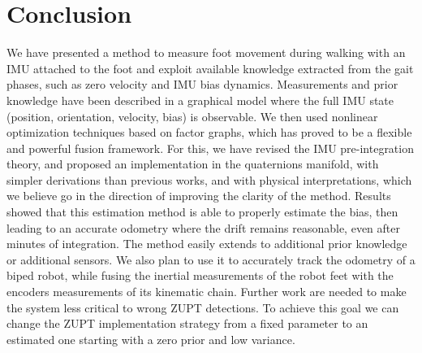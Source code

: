 
\section{Conclusion}

We have presented a method to measure foot movement during walking with an IMU attached to the foot and exploit available knowledge extracted from the gait phases, such as zero velocity and IMU bias dynamics. 
Measurements and prior knowledge have been described in a graphical model where the full IMU state (position, orientation, velocity, bias) is observable. 
We then used nonlinear optimization techniques based on factor graphs, which has proved to be a flexible and powerful fusion framework. For this, we have revised the IMU pre-integration theory, and proposed an implementation in the quaternions manifold, with simpler derivations than previous works, and with physical interpretations, which we believe go in the direction of improving the clarity of the method.
Results showed that this estimation method is able to properly estimate the bias, then leading to an accurate odometry where the drift remains reasonable, even after minutes of integration. 
The method easily extends to additional prior knowledge or additional sensors. 
We also plan to use it to accurately track the odometry of a biped robot, while fusing the inertial measurements of the robot feet with the encoders measurements of its kinematic chain. 
Further work are needed to make the system less critical to wrong ZUPT detections. To achieve this goal we can change the ZUPT implementation strategy from a fixed parameter to an estimated one starting with a zero prior and low variance.
